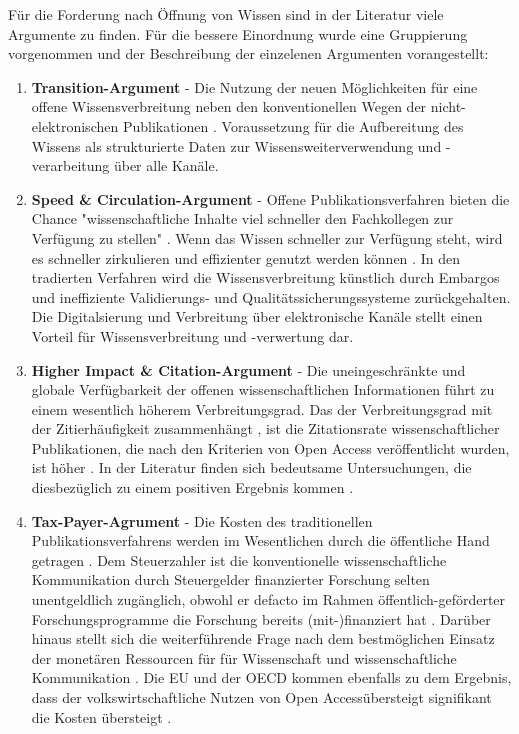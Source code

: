 Für die Forderung nach Öffnung von Wissen sind in der Literatur viele Argumente zu finden. Für die bessere Einordnung wurde eine Gruppierung vorgenommen und der Beschreibung der einzelenen Argumenten vorangestellt:
\begin{enumerate}
\item \textbf{Transition-Argument} - Die Nutzung der neuen Möglichkeiten für eine offene Wissensverbreitung neben den konventionellen Wegen der nicht-elektronischen Publikationen \cite{berliner_erklaerung_2003}. Voraussetzung für die Aufbereitung des Wissens als strukturierte Daten zur Wissensweiterverwendung und -verarbeitung über alle Kanäle.
\item \textbf{Speed & Circulation-Argument} - Offene Publikationsverfahren bieten die Chance "wissenschaftliche Inhalte viel schneller den Fachkollegen zur Verfügung zu stellen" \cite{muller_2010_open}. Wenn das Wissen schneller zur Verfügung steht, wird es schneller zirkulieren und effizienter genutzt werden können \cite{Woelfle_2011}. In den tradierten Verfahren wird die Wissensverbreitung künstlich durch Embargos und ineffiziente Validierungs- und Qualitätssicherungssysteme zurückgehalten. Die Digitalsierung und Verbreitung über elektronische Kanäle stellt einen Vorteil für Wissensverbreitung und -verwertung dar. 
\item \textbf{Higher Impact & Citation-Argument} - Die uneingeschränkte und globale Verfügbarkeit der offenen wissenschaftlichen Informationen führt zu einem wesentlich höherem Verbreitungsgrad\cite{muller_2010_open}. Das der Verbreitungsgrad mit der Zitierhäufigkeit zusammenhängt \cite{muller_2010_open}, ist die Zitationsrate wissenschaftlicher Publikationen, die nach den Kriterien von Open Access veröffentlicht wurden, ist höher \cite{cite:21a}. In der Literatur finden sich bedeutsame Untersuchungen, die diesbezüglich zu einem positiven Ergebnis kommen \cite{Lawrence_2001} \cite{Jeffrey_2008} \cite{Eysenbach_2006} \cite{Antelman_2004}.
\item \textbf{Tax-Payer-Agrument} - Die Kosten des traditionellen Publikationsverfahrens werden im Wesentlichen durch die öffentliche Hand getragen \cite{muller_2010_open}. Dem Steuerzahler ist die konventionelle wissenschaftliche Kommunikation durch Steuergelder finanzierter Forschung selten unentgeldlich zugänglich, obwohl er defacto im Rahmen öffentlich-geförderter Forschungsprogramme die Forschung bereits (mit-)finanziert hat \cite{suber_2003_taxpayer} \cite{Adema_2014_open_access}. Darüber hinaus stellt sich die weiterführende Frage nach dem bestmöglichen Einsatz der monetären Ressourcen für für Wissenschaft und wissenschaftliche Kommunikation \cite{Glasziou_2014} \cite{altman_1994_scandal}. Die EU und der OECD kommen ebenfalls zu dem Ergebnis, dass der volkswirtschaftliche Nutzen von Open Accessübersteigt signifikant die Kosten übersteigt \cite{WD_bundestag_2009}. 

\end{enumerate}
